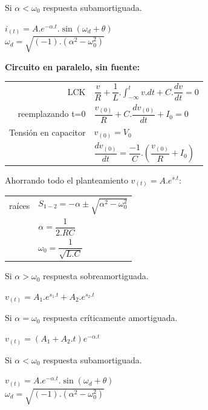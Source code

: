 \documentclass[11pt,a4paper,twocolumn]{article}
\begin{document}
		Si $\alpha < \omega_{0}$ respuesta subamortiguada.
		\begin{center}
			$i_{(t)}=A.e^{-\alpha.t}.\sin(\omega_{d}+\theta)$\\
			\tiny{$\omega_{d}=\sqrt{(-1).(\alpha^{2}-\omega_{0}^{2})}$}
		\end{center}
	
		\textbf{Circuito en paralelo, sin fuente:}\\
		\begin{tabular}{r | l} \vspace{.2cm}
			LCK&$\dfrac{v}{R}+\dfrac{1}{L}.\int_{-\infty}^{t}v.dt+C.\dfrac{dv}{dt}=0 $ \\ \vspace{.2cm}
			\tiny{reemplazando t=0}& $ \dfrac{v_{(0)}}{R}+C.\dfrac{dv_{(0)}}{dt}+I_{0}=0$ \\ \vspace{.2cm}
			Tensión en capacitor& $v_{(0)}=V_{0}$ \\ \vspace{.2cm}
			&$\dfrac{dv_{(0)}}{dt}= \dfrac{-1}{C}.(\dfrac{v_{(0)}}{R}+I_{0}) $
		\end{tabular}
	
		Ahorrando todo el planteamiento $v_{(t)}=A.e^{s.t}$:
		\begin{tabular}{r | l} \vspace{.2cm}
			raíces& $S_{1-2}=-\alpha\pm \sqrt{\alpha^{2}-\omega_{0}^{2}}$\\ \vspace{.2cm}
			&$\alpha=\dfrac{1}{2.RC}$ \\ \vspace{.2cm}
			&$\omega_{0}=\dfrac{1}{\sqrt{L.C}}$
		\end{tabular}
	
		Si $\alpha > \omega_{0}$ respuesta sobreamortiguada.
	\begin{center}
		$v_{(t)}=A_{1}.e^{s_{1}.t}+A_{2}.e^{s_{2}.t}$
	\end{center}
	
	Si $\alpha = \omega_{0}$ respuesta críticamente amortiguada.
	\begin{center}
		$v_{(t)}=(A_{1}+A_{2}.t)e^{-\alpha.t}$
	\end{center}
	
	Si $\alpha < \omega_{0}$ respuesta subamortiguada.
	\begin{center}
		$v_{(t)}=A.e^{-\alpha.t}.\sin(\omega_{d}+\theta)$\\
		\tiny{$\omega_{d}=\sqrt{(-1).(\alpha^{2}-\omega_{0}^{2})}$}
	\end{center}
\end{document}
